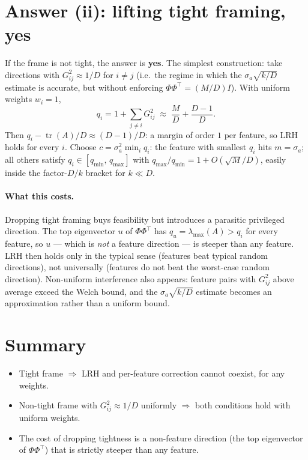 \documentclass[11pt]{article}
\newcommand{\tr}{\operatorname{tr}}
\begin{document}
\section{Answer (ii): lifting tight framing, yes}

If the frame is not tight, the answer is \textbf{yes}. The simplest
construction: take directions with $G_{ij}^2 \approx 1/D$ for $i \ne
j$ (i.e.\ the regime in which the $\sigma_a\sqrt{k/D}$ estimate is
accurate, but without enforcing $\Phi\Phi^\top = (M/D)I$). With
uniform weights $w_i = 1$,
\[
  q_i = 1 + \sum_{j\ne i} G_{ij}^2 \;\approx\; \frac{M}{D} + \frac{D-1}{D}.
\]
Then $q_i - \tr(A)/D \approx (D-1)/D$: a margin of order $1$ per
feature, so LRH holds for every $i$. Choose $c = \sigma_a^2 \min_i
q_i$: the feature with smallest $q_i$ hits $m = \sigma_a$; all others
satisfy $q_i \in [q_{\min},\, q_{\max}]$ with $q_{\max}/q_{\min} = 1 +
O(\sqrt{M}/D)$, easily inside the factor-$D/k$ bracket for $k \ll D$.

\paragraph{What this costs.}
Dropping tight framing buys feasibility but introduces a parasitic
privileged direction. The top eigenvector $u$ of $\Phi\Phi^\top$ has
$q_u = \lambda_{\max}(A) > q_i$ for every feature, so $u$ --- which is
\emph{not} a feature direction --- is steeper than any feature. LRH
then holds only in the typical sense (features beat typical random
directions), not universally (features do not beat the worst-case
random direction). Non-uniform interference also appears: feature
pairs with $G_{ij}^2$ above average exceed the Welch bound, and the
$\sigma_a\sqrt{k/D}$ estimate becomes an approximation rather than a
uniform bound.

\section{Summary}

\begin{itemize}
  \item Tight frame $\Rightarrow$ LRH and per-feature correction
    cannot coexist, for any weights.
  \item Non-tight frame with $G_{ij}^2 \approx 1/D$ uniformly
    $\Rightarrow$ both conditions hold with uniform weights.
  \item The cost of dropping tightness is a non-feature direction
    (the top eigenvector of $\Phi\Phi^\top$) that is strictly steeper
    than any feature.
\end{itemize}
\end{document}
